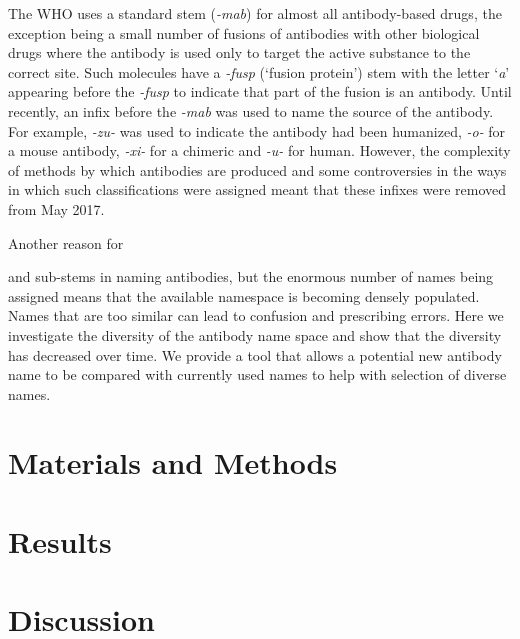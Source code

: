 \documentclass{article}
\begin{document}
The WHO uses a standard stem (\emph{-mab}) for almost all
antibody-based drugs, the exception being a small number of fusions of
antibodies with other biological drugs where the antibody is used only
to target the active substance to the correct site. Such molecules
have a \emph{-fusp} (`fusion protein') stem with the letter `\emph{a}'
appearing before the \emph{-fusp} to indicate that part of the fusion
is an antibody. Until recently, an infix before the \emph{-mab} was
used to name the source of the antibody. For example, \emph{-zu-} was
used to indicate the antibody had been humanized, \emph{-o-} for a
mouse antibody, \emph{-xi-} for a chimeric and \emph{-u-} for
human\cite{xxx}. However, the complexity of methods by which
antibodies are produced and some controversies in the ways in which
such classifications were assigned meant that these infixes were
removed from May 2017\cite{xxx}.


Another reason for 

and sub-stems in naming antibodies, but the
enormous number of names being assigned means that the available
namespace is becoming densely populated. Names that are too similar
can lead to confusion and prescribing errors. Here we investigate the
diversity of the antibody name space and show that the diversity has
decreased over time. We provide a tool that allows a potential new
antibody name to be compared with currently used names to help with
selection of diverse names.

\section{Materials and Methods}

\section{Results}

\section{Discussion}


\end{document}
